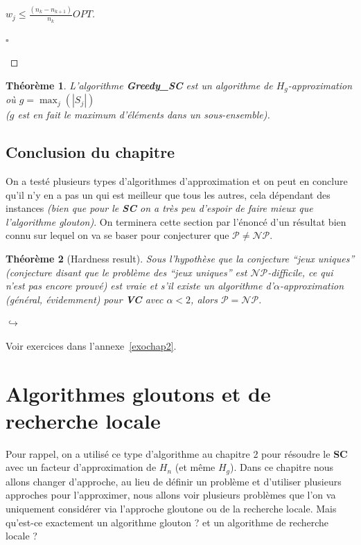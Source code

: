 \documentclass{article}
\newcommand{\titre}[1]{\textcolor{title}{#1}}
\newcommand{\cqfd}{\begin{flushright}$\square$\end{flushright}}
\newtheorem{thm}{Th\'eor\`eme}[section]
\newtheorem{proof}{Preuve}[section]
\begin{document}
\begin{sffamily}
\begin{proof}[$w_j \leq \frac{(n_k - n_{k+1})}{n_k}OPT$]
\cqfd
\end{proof}

\begin{thm} L'algorithme \textbf{Greedy\_SC} est un algorithme de
$H_g$-approximation où $g = \max_{j}(|S_j|)$\\ ($g$ est en fait le maximum
d'éléments dans un sous-ensemble).
\end{thm}

\subsection{Conclusion du chapitre}

On a testé plusieurs types d'algorithmes d'approximation et on peut en conclure
qu'il n'y en a pas un qui est meilleur que tous les autres, cela dépendant des
instances \textit{(bien que pour le \titre{\textbf{SC}} on a très peu d'espoir
de faire mieux que l'algorithme glouton)}. On terminera cette section par
l'énoncé d'un résultat bien connu sur lequel on va se baser pour conjecturer
que $\mathcal{P} \neq \mathcal{NP}$.

\begin{thm}[Hardness result]
Sous l'hypothèse que la conjecture ``jeux uniques'' (conjecture disant que le
problème des ``jeux uniques'' est $\mathcal{NP}$-difficile, ce qui n'est pas
encore prouvé) est vraie et s'il existe un algorithme
d'$\alpha$-approximation (général, évidemment) pour \textbf{\titre{VC}} avec
$\alpha < 2$, alors $\mathcal{P} = \mathcal{NP}$.
\end{thm}

\vspace{22em}
\begin{flushright}
$\hookrightarrow$
\begin{large}Voir exercices dans l'annexe~\ref{exochap2}.\end{large}
\end{flushright}

\newpage

\section{Algorithmes gloutons et de recherche locale}

Pour rappel, on a utilisé ce type d'algorithme au chapitre 2 pour résoudre le
\textbf{\titre{SC}} avec un facteur d'approximation de $H_n$ (et même $H_g$).
Dans ce chapitre nous allons changer d'approche, au lieu de définir un problème
et d'utiliser plusieurs approches pour l'approximer, nous allons voir plusieurs
problèmes que l'on va uniquement considérer via l'approche gloutone ou de la
recherche locale. Mais qu'est-ce exactement un algorithme glouton ? et un
algorithme de recherche locale ?


\end{sffamily}
\end{document}
